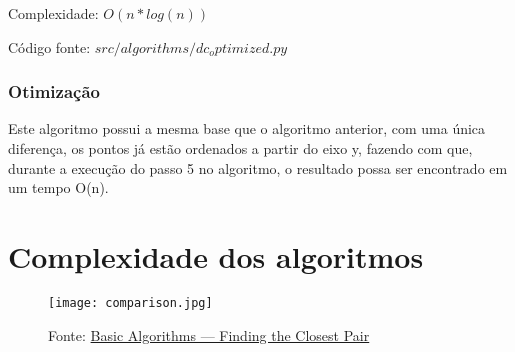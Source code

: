 \documentclass[10pt,a4paper]{article}
\begin{document}
    Complexidade: $O(n*log(n))$

    Código fonte: $src/algorithms/dc_optimized.py$

    \subsubsection{Otimização}

    Este algoritmo possui a mesma base que o algoritmo anterior, com uma única diferença, os pontos 
    já estão ordenados a partir do eixo y, fazendo com que, durante a execução do passo 5 no algoritmo, 
    o resultado possa ser encontrado em um tempo O(n).

    \section{Complexidade dos algoritmos} 

    \begin{figure}[ht]
        \centering 
        \texttt{[image: comparison.jpg]}
        \caption{Fonte: \href{https://towardsdatascience.com/basic-algorithms-finding-the-closest-pair-5fbef41e9d55}{Basic Algorithms — Finding the Closest Pair}}
    \end{figure}
\end{document}
